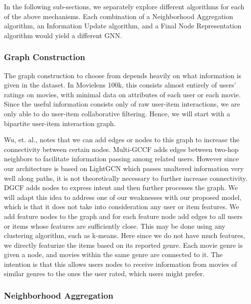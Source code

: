 \documentclass{article}
\begin{document}
In the following sub-sections, we separately explore different algorithms for each of the above mechanisms. Each combination of a Neighborhood Aggregation algorithm, an Information Update algorithm, and a Final Node Representation algorithm would yield a different GNN. 

\subsubsection{Graph Construction}

The graph construction to choose from depends heavily on what information is given in the dataset. In Movielens 100k, this consists almost entirely of users' ratings on movies, with minimal data on attributes of each user or each movie. Since the useful information consists only of raw user-item interactions, we are only able to do user-item collaborative filtering. Hence, we will start with a bipartite user-item interaction graph.

Wu, et. al., \cite{survey} notes that we can add edges or nodes to this graph to increase the connectivity between certain nodes. Multi-GCCF \cite{multigccf} adds edges between two-hop neighbors to facilitate information passing among related users. However since our architecture is based on LightGCN which passes unaltered information very well along paths, it is not theoretically necessary to further increase connectivity. DGCF \cite{dgcf} adds nodes to express intent and then further processes the graph. We will adapt this idea to address one of our weaknesses with our proposed model, which is that it does not take into consideration any user or item features. We add feature nodes to the graph and for each feature node add edges to all users or items whose features are sufficiently close. This may be done using any clustering algorithm, such as k-means. Here since we do not have much features, we directly featurize the items based on its reported genre. Each movie genre is given a node, and movies within the same genre are connected to it. The intention is that this allows users nodes to receive information from movies of similar genres to the ones the user rated, which users might prefer.

\subsubsection{Neighborhood Aggregation}
\label{neighborhood_aggregation}
\end{document}
